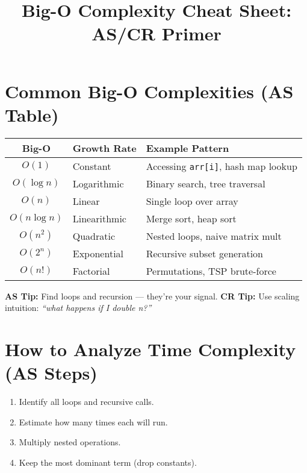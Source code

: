 \documentclass{article}
\title{Big-O Complexity Cheat Sheet: AS/CR Primer}
\author{}
\date{}
\begin{document}
\maketitle

\section*{ Common Big-O Complexities (AS Table)}

\begin{tabular}{|c|l|l|}
\hline
\textbf{Big-O} & \textbf{Growth Rate}        & \textbf{Example Pattern} \\
\hline
\( O(1) \)     & Constant                    & Accessing \texttt{arr[i]}, hash map lookup \\
\( O(\log n) \) & Logarithmic                 & Binary search, tree traversal \\
\( O(n) \)     & Linear                      & Single loop over array \\
\( O(n \log n) \) & Linearithmic              & Merge sort, heap sort \\
\( O(n^2) \)   & Quadratic                   & Nested loops, naive matrix mult \\
\( O(2^n) \)   & Exponential                 & Recursive subset generation \\
\( O(n!) \)    & Factorial                   & Permutations, TSP brute-force \\
\hline
\end{tabular}

\vspace{1em}
\textbf{AS Tip:} Find loops and recursion — they’re your signal.  
\textbf{CR Tip:} Use scaling intuition: \textit{“what happens if I double n?”}

\section*{ How to Analyze Time Complexity (AS Steps)}

\begin{enumerate}
    \item Identify all loops and recursive calls.
    \item Estimate how many times each will run.
    \item Multiply nested operations.
    \item Keep the most dominant term (drop constants).
\end{enumerate}
\end{document}
